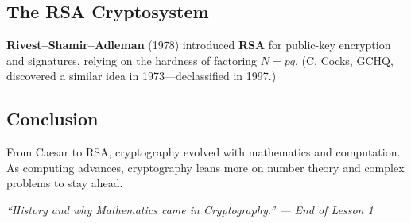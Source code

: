 \subsection{The RSA Cryptosystem}

\textbf{Rivest–Shamir–Adleman} (1978) introduced \textbf{RSA} for public-key encryption and signatures, relying on the hardness of factoring \(N=pq\). (C. Cocks, GCHQ, discovered a similar idea in 1973—declassified in 1997.)

\subsection{Conclusion}

From Caesar to RSA, cryptography evolved with mathematics and computation. As computing advances, cryptography leans more on number theory and complex problems to stay ahead.

\begin{center}
\textit{“History and why Mathematics came in Cryptography.” — End of Lesson 1}
\end{center}
